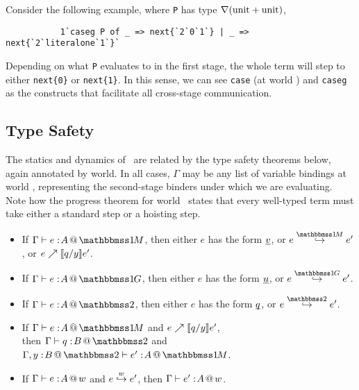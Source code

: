 Consider the following example, where {\tt P} has type $\nabla({\rm unit} + {\rm unit})$,\begin{lstlisting}
           1`caseg P of _ => next{`2`0`1`} | _ => next{`2`literalone`1`}`
\end{lstlisting}
Depending on what {\tt P} evaluates to in the first stage, 
the whole term will step to either {\tt next\{0\}} or {\tt next\{1\}}.
In this sense, we can see {\tt case} (at world \bbonem) and {\tt caseg} as the constructs that facilitate
all cross-stage communication.

\subsection{Type Safety}

The statics and dynamics of \lang\ are related by the type safety theorems below, again annotated by world.
In all cases, $\Gamma$ may be any list of variable bindings at world \bbtwo,
representing the second-stage binders under which we are evaluating.
Note how the progress theorem for world \bbonem\ states that every well-typed term must take 
either a standard step or a hoisting step.
\begin{abstrsyn}
\begin{theorem} [Progress]
\label{thm:progress} 
\vspace{-0.75em}
\begin{itemize} 
\item If $\typesone e A$, then either $e$ has the form $\underline{\smash{v}}$, or $\stepmix e {e'}$, or ${e}\nearrow \llbracket q/y \rrbracket{e'}$.
\item If $\typespure e A$, then either $e$ has the form $\underline{\smash{u}}$, or $\steppure e {e'}$.
\item If $\typestwo e A$, then either $e$ has the form $\underline{\smash{q}}$, or $\steptwo e {e'}$.
\end{itemize}
\end{theorem}
\begin{theorem} [Preservation]
\label{thm:preservation} 
\vspace{-0.75em}
\begin{itemize} 
\item If $\typesone e A$ and ${e}\nearrow \llbracket q/y \rrbracket{e'}$, \\
	then $\typestwo q B$ and \mbox{$\typesone [\Gamma,\coltwo y B] {e'} A$}.
\item If $\Gamma{} \vdash {e}:\!{A}~\hspace{-0.2em}\textsc{\textrm{@}}\hspace{-0.2em}~w$ and ${e}\overset{w}\hookrightarrow {e'}$, then $\Gamma{} \vdash {e'}:\!{A}~\hspace{-0.2em}\textsc{\textrm{@}}\hspace{-0.2em}~w$.
\end{itemize}
\end{theorem}
\end{abstrsyn}


